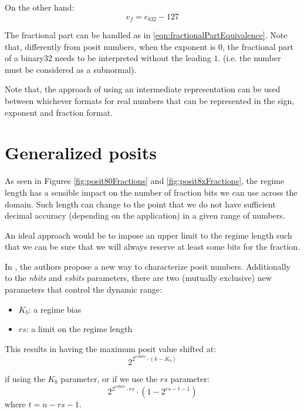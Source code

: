 On the other hand:
\begin{equation}
    e_{f} = e_{b32} - 127
\end{equation}

The fractional part can be handled as in \eqref{eqn:fractionalPartEquivalence}. Note that, differently from posit numbers, when the exponent is $0$, the fractional part of a binary32 needs to be interpreted without the leading $1.$ (i.e. the number must be considered as a subnormal).

Note that, the approach of using an intermediate representation can be used between whichever formats for real numbers that can be represented in the sign, exponent and fraction format.


\section{Generalized posits}

As seen in Figures \ref{fig:posit80Fractions} and \ref{fig:posit8xFractions}, the regime length has a sensible impact on the number of fraction bits we can use across the domain. Such length can change to the point that we do not have sufficient decimal accuracy (depending on the application) in a given range of numbers. 

An ideal approach would be to impose an upper limit to the regime length such that we can be sure that we will always reserve at least some bits for the fraction.

In \cite{9151086}, the authors propose a new way to characterize posit numbers. Additionally to the \textit{nbits}  and \textit{esbits} parameters, there are two (mutually exclusive) new parameters that control the dynamic range:
\begin{itemize}
    \item $K_b$: a regime bias 
    \item $rs$: a limit on the regime length
\end{itemize}

This results in having the maximum posit value shifted at:
\begin{equation}
    2^{2^{esbits} \cdot (k-K_b)}
\end{equation}

if using the $K_b$ parameter, or if we use the $rs$ parameter:
\begin{equation}
    2^{2^{esbits} \cdot rs} \cdot (1 - 2^{es - t - 1})
\end{equation}
where $ t = n - rs - 1$.


